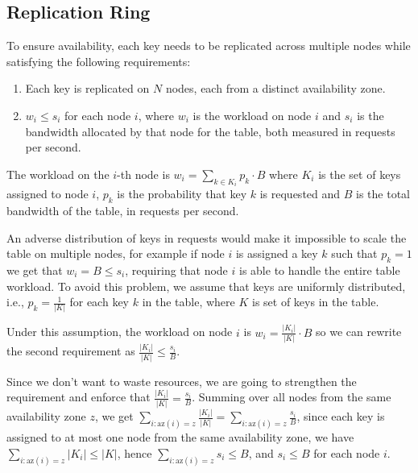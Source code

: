 \subsection{Replication Ring}
\label{subsec:replication-ring}

To ensure availability, each key needs to be replicated across multiple nodes
while satisfying the following requirements:

\begin{enumerate}
    \item Each key is replicated on $N$ nodes, each from a distinct
        availability zone.
    \item $w_i \leq s_i$ for each node $i$, where $w_i$ is the workload on node
        $i$ and $s_i$ is the bandwidth allocated by that node for the table,
        both measured in requests per second.
\end{enumerate}

The workload on the $i$-th node is $w_i = \sum_{k \in K_i} p_k \cdot B$ where
$K_i$ is the set of keys assigned to node $i$, $p_k$ is the probability that
key $k$ is requested and $B$ is the total bandwidth of the table, in requests
per second.

An adverse distribution of keys in requests would make it impossible to scale
the table on multiple nodes, for example if node $i$ is assigned a key $k$ such
that $p_k = 1$ we get that $w_i = B \leq s_i$, requiring that node $i$ is able
to handle the entire table workload.
To avoid this problem, we assume that keys are uniformly distributed, i.e.,
$p_k = \frac{1}{|K|}$ for each key $k$ in the table, where $K$ is set of keys
in the table.

Under this assumption, the workload on node $i$ is $w_i = \frac{|K_i|}{|K|}
\cdot B$ so we can rewrite the second requirement as $\frac{|K_i|}{|K|} \leq
\frac{s_i}{B}$.

Since we don't want to waste resources, we are going to strengthen the
requirement and enforce that $\frac{|K_i|}{|K|} = \frac{s_i}{B}$.
Summing over all nodes from the same availability zone $z$, we get $\sum_{i :
\mathrm{az}(i) = z} \frac{|K_i|}{|K|} = \sum_{i : \mathrm{az}(i) = z}
\frac{s_i}{B}$, since each key is assigned to at most one node from the same
availability zone, we have $\sum_{i : \mathrm{az}(i) = z} |K_i| \leq |K|$,
hence $\sum_{i : \mathrm{az}(i) = z} s_i \leq B$, and $s_i \leq B$ for each
node $i$.


